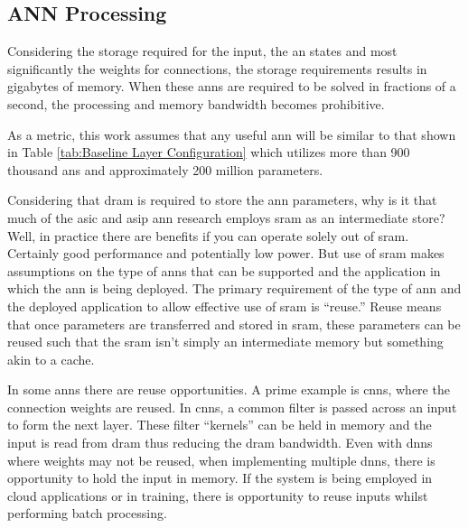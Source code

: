 \subsection[ANN Processing]{ANN Processing}
\label{sec:ANN Processing}

Considering the storage required for the input, the \ac{an} states and most significantly the weights for connections, the storage requirements results in gigabytes of memory.
When these \ac{ann}s are required to be solved in fractions of a second, the processing and memory bandwidth becomes prohibitive.

As a metric, this work assumes that any useful \ac{ann} will be similar to that shown in Table \ref{tab:Baseline Layer Configuration} which utilizes more than 900 thousand \acp{an} and approximately 200 million parameters. 
\iffalse
Given the bandwidth and storage requirements shown in Table \ref{tab:Bandwidth and Storage Design Requirements}, the problem becomes \hyphenquote{american}{\textbf{\textcolor{black}{to provide deterministic at or near real-time performance within tolerable power and space constraints for embedded systems employing inference on multiple disparate useful-sized neural networks.}}}
\fi
\iffalse
Considering that \ac{dram} is required to store the \ac{ann} parameters, why is it that much of the \ac{asic} and \ac{asip} \ac{ann} research employs \ac{sram} as an intermediate store? Well, in practice there are benefits if you can operate solely out of \ac{sram}.
Certainly good performance and potentially low power.
But use of \ac{sram} makes assumptions on the type of \acp{ann} that can be supported and the application in which the \ac{ann} is being deployed.
The primary requirement of the type of \ac{ann} and the deployed application to allow effective use of \ac{sram} is ``reuse.'' Reuse means that once parameters are transferred and stored in \ac{sram}, these parameters can be reused such that the \ac{sram} isn't simply an intermediate memory but something akin to a cache.

In some \ac{ann}s there are reuse opportunities. A prime example is \acp{cnn}, where the connection weights are reused. In \acp{cnn}, a common filter is passed across an input to form the next layer. These filter ``kernels'' can be held in memory and the input is read from \ac{dram} thus reducing the \ac{dram} bandwidth.
Even with \ac{dnn}s where weights may not be reused, when implementing multiple \ac{dnn}s, there is opportunity to hold the input in memory.
If the system is being employed in cloud applications or in training, there is opportunity to reuse inputs whilst performing batch processing.


